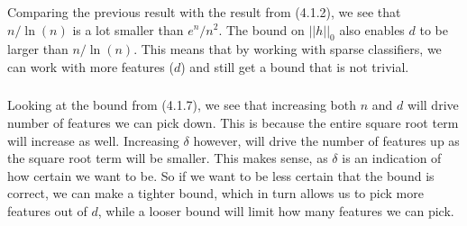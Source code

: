 \documentclass[a4paper]{article}
\def\dpip{|\!|}
\begin{document}
\subsubsection{}
Comparing the previous result with the result from (4.1.2), we see that $n/\ln(n)$ is a lot smaller than $e^n/n^2$. The bound on $\dpip h\dpip_0$ also enables $d$ to be larger than $n/\ln(n)$. This means that by working with sparse classifiers, we can work with more features ($d$) and still get a bound that is not trivial.

\subsubsection{}
Looking at the bound from (4.1.7), we see that increasing both $n$ and $d$ will drive number of features we can pick down. This is because the entire square root term will increase as well. Increasing $\delta$ however, will drive the number of features up as the square root term will be smaller. This makes sense, as $\delta$ is an indication of how certain we want to be. So if we want to be less certain that the bound is correct, we can make a tighter bound, which in turn allows us to pick more features out of $d$, while a looser bound will limit how many features we can pick.
\end{document}
